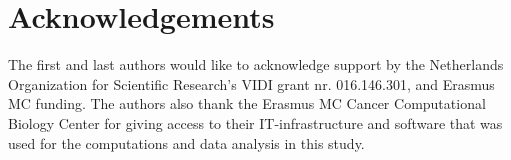 
\section*{Acknowledgements}
The first and last authors would like to acknowledge support by the Netherlands Organization for Scientific Research's VIDI grant nr. 016.146.301, and Erasmus MC funding. The authors also thank the Erasmus MC Cancer Computational Biology Center for giving access to their IT-infrastructure and software that was used for the computations and data analysis in this study.\vspace*{-8pt}